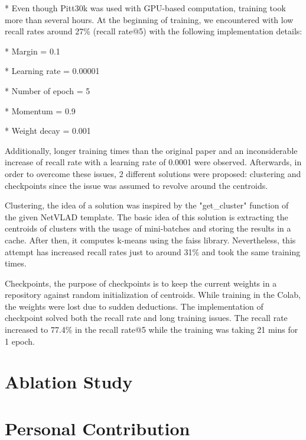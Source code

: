 \documentclass[10pt,twocolumn,letterpaper]{article}
\begin{document}
* Even though Pitt30k was used with GPU-based computation, training took more than several hours.
At the beginning of training, we encountered with low recall rates around 27\% (recall rate@5) with the following implementation details:

* Margin = 0.1

* Learning rate = 0.00001

* Number of epoch = 5

* Momentum = 0.9

* Weight decay = 0.001

Additionally, longer training times than the original paper and an inconsiderable increase of recall rate with a learning rate of 0.0001 were observed. Afterwards, in order to overcome these issues, 2 different solutions were proposed: clustering and checkpoints since the issue was assumed to revolve around the centroids.

Clustering, the idea of a solution was inspired by the "get\_cluster" function of the given NetVLAD template. The basic idea of this solution is extracting the centroids of clusters with the usage of mini-batches and storing the results in a cache. After then, it computes k-means using the faiss library. Nevertheless, this attempt has increased recall rates just to around 31\% and took the same training times.

Checkpoints, the purpose of checkpoints is to keep the current weights in a repository against random initialization of centroids. While training in the Colab, the weights were lost due to sudden deductions. The implementation of checkpoint solved both the recall rate and long training issues. The recall rate increased to 77.4\% in the recall rate@5 while the training was taking 21 mins for 1 epoch.

\section{Ablation Study}

\section{Personal Contribution}
\end{document}
